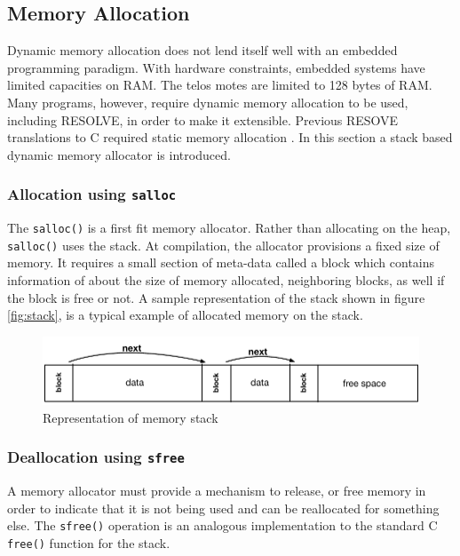 \documentclass{sig-alternate}
\begin{document}

\subsection{Memory Allocation}

Dynamic memory allocation does not lend itself well with an embedded programming paradigm. With hardware constraints, embedded systems have limited capacities on RAM. The telos motes are limited to 128 bytes of RAM. Many programs, however, require dynamic memory allocation to be used, including RESOLVE, in order to make it extensible. Previous RESOVE translations to C required static memory allocation \cite{regula:2010}. In this section a stack based dynamic memory allocator is introduced.

\subsubsection{Allocation using \texttt{salloc}}

The \texttt{salloc()} is a first fit memory allocator. Rather than allocating on the heap, \texttt{salloc()} uses the stack. At compilation, the allocator provisions a fixed size of memory. It requires a small section of meta-data called a block which contains information of about the size of memory allocated, neighboring blocks, as well if the block is free or not. A sample representation of the stack shown in figure \ref{fig:stack}, is a typical example of allocated memory on the stack.

\begin{figure}[!htb]
\centering
\includegraphics[scale=.55]{figs/stack.pdf}
\caption{Representation of memory stack}
\end{figure}
\label{fig:stack}

\subsubsection{Deallocation using \texttt{sfree}}

A memory allocator must provide a mechanism to release, or free memory in order to indicate that it is not being used and can be reallocated for something else. The \texttt{sfree()} operation is an analogous implementation to the standard C \texttt{free()} function for the stack.
\end{document}
